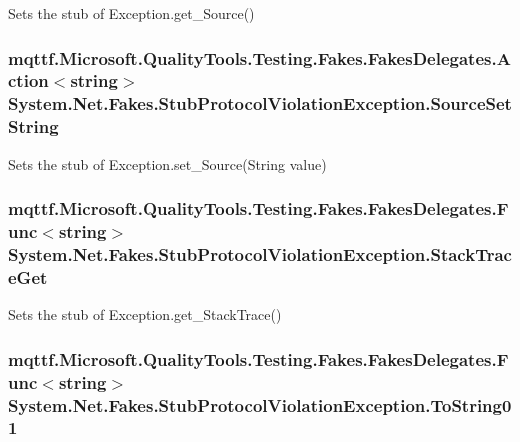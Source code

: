 Sets the stub of Exception.\-get\-\_\-\-Source()

\hypertarget{class_system_1_1_net_1_1_fakes_1_1_stub_protocol_violation_exception_aa1ed3a1defb1f79c23208c674fc7d468}{
\subsubsection[{Source\-Set\-String}]{\setlength{\rightskip}{0pt plus 5cm}mqttf.\-Microsoft.\-Quality\-Tools.\-Testing.\-Fakes.\-Fakes\-Delegates.\-Action$<$string$>$ System.\-Net.\-Fakes.\-Stub\-Protocol\-Violation\-Exception.\-Source\-Set\-String}}\label{class_system_1_1_net_1_1_fakes_1_1_stub_protocol_violation_exception_aa1ed3a1defb1f79c23208c674fc7d468}


Sets the stub of Exception.\-set\-\_\-\-Source(\-String value)

\hypertarget{class_system_1_1_net_1_1_fakes_1_1_stub_protocol_violation_exception_ace3e3073694086bb648545abdeeea3ac}{
\subsubsection[{Stack\-Trace\-Get}]{\setlength{\rightskip}{0pt plus 5cm}mqttf.\-Microsoft.\-Quality\-Tools.\-Testing.\-Fakes.\-Fakes\-Delegates.\-Func$<$string$>$ System.\-Net.\-Fakes.\-Stub\-Protocol\-Violation\-Exception.\-Stack\-Trace\-Get}}\label{class_system_1_1_net_1_1_fakes_1_1_stub_protocol_violation_exception_ace3e3073694086bb648545abdeeea3ac}


Sets the stub of Exception.\-get\-\_\-\-Stack\-Trace()

\hypertarget{class_system_1_1_net_1_1_fakes_1_1_stub_protocol_violation_exception_a048e261c1aeae5df3334e20d31ef0613}{
\subsubsection[{To\-String01}]{\setlength{\rightskip}{0pt plus 5cm}mqttf.\-Microsoft.\-Quality\-Tools.\-Testing.\-Fakes.\-Fakes\-Delegates.\-Func$<$string$>$ System.\-Net.\-Fakes.\-Stub\-Protocol\-Violation\-Exception.\-To\-String01}}\label{class_system_1_1_net_1_1_fakes_1_1_stub_protocol_violation_exception_a048e261c1aeae5df3334e20d31ef0613}


